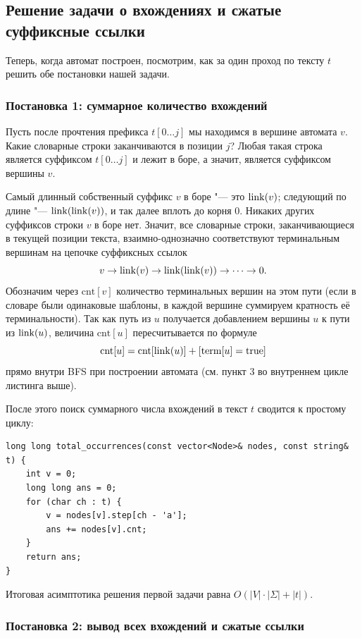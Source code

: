 \subsection{Решение задачи о вхождениях и сжатые суффиксные ссылки}

Теперь, когда автомат построен, посмотрим, как за один проход по тексту $t$ решить обе постановки нашей задачи.

\subsubsection{Постановка 1: суммарное количество вхождений}

Пусть после прочтения префикса $t[0 \dots j]$ мы находимся в вершине автомата $v$. Какие словарные строки заканчиваются в позиции $j$? Любая такая строка является суффиксом $t[0 \dots j]$ и лежит в боре, а значит, является суффиксом вершины $v$.

Самый длинный собственный суффикс $v$ в боре "--- это $\operatorname{link}(v)$; следующий по длине "--- $\operatorname{link}(\operatorname{link}(v))$, и так далее вплоть до корня $0$. Никаких других суффиксов строки $v$ в боре нет. Значит, все словарные строки, заканчивающиеся в текущей позиции текста, взаимно-однозначно соответствуют терминальным вершинам на цепочке суффиксных ссылок
\[
    v \to \operatorname{link}(v) \to \operatorname{link}(\operatorname{link}(v)) \to \dots \to 0.
\]
Обозначим через $\text{cnt}[v]$ количество терминальных вершин на этом пути (если в словаре были одинаковые шаблоны, в каждой вершине суммируем кратность её терминальности). Так как путь из $u$ получается добавлением вершины $u$ к пути из $\operatorname{link}(u)$, величина $\text{cnt}[u]$ пересчитывается по формуле
\[
    \text{cnt}[u] = \text{cnt}[\operatorname{link}(u)] + [\text{term}[u] = \text{true}]
\]
прямо внутри BFS при построении автомата (см. пункт 3 во внутреннем цикле листинга выше).

После этого поиск суммарного числа вхождений в текст $t$ сводится к простому циклу:
\begin{lstlisting}[caption={Подсчёт суммарного числа вхождений за $O(|t|)$}]
long long total_occurrences(const vector<Node>& nodes, const string& t) {
    int v = 0;
    long long ans = 0;
    for (char ch : t) {
        v = nodes[v].step[ch - 'a'];
        ans += nodes[v].cnt;
    }
    return ans;
}
\end{lstlisting}
Итоговая асимптотика решения первой задачи равна $O(|V| \cdot |\Sigma| + |t|)$.

\subsubsection{Постановка 2: вывод всех вхождений и сжатые ссылки}

